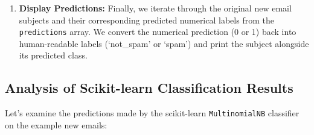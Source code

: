 \documentclass[12pt,letterpaper]{article}
\begin{document}
\begin{enumerate}
    \item \textbf{Display Predictions:} Finally, we iterate through the original new email subjects and their corresponding predicted numerical labels from the \texttt{predictions} array. We convert the numerical prediction (0 or 1) back into human-readable labels (`not\_spam' or `spam') and print the subject alongside its predicted class.
\end{enumerate}

\subsection{Analysis of Scikit-learn Classification Results}

Let's examine the predictions made by the scikit-learn \texttt{MultinomialNB} classifier on the example new emails:
\end{document}
